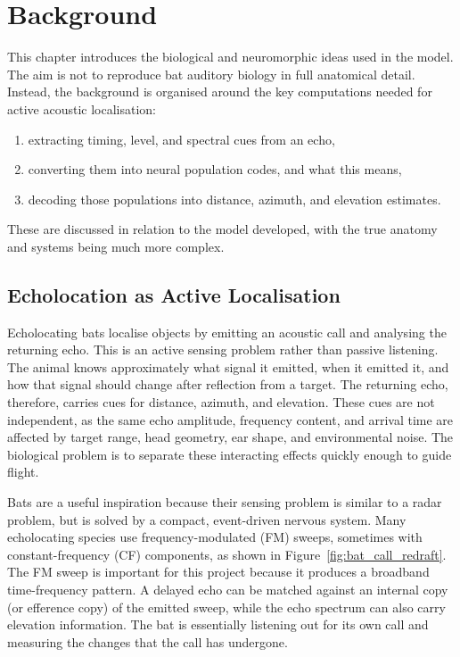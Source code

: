 \chapter{Background} \label{ch:background}

This chapter introduces the biological and neuromorphic ideas used in the model. The aim is not to reproduce bat auditory biology in full anatomical detail. Instead, the background is organised around the key computations needed for active acoustic localisation: 
\begin{enumerate}
    \item extracting timing, level, and spectral cues from an echo,
    \item converting them into neural population codes, and what this means,
    \item decoding those populations into distance, azimuth, and elevation estimates.
\end{enumerate}
These are discussed in relation to the model developed, with the true anatomy and systems being much more complex.


\section{Echolocation as Active Localisation}

Echolocating bats localise objects by emitting an acoustic call and analysing the returning echo. This is an active sensing problem rather than passive listening. The animal knows approximately what signal it emitted, when it emitted it, and how that signal should change after reflection from a target. The returning echo, therefore, carries cues for distance, azimuth, and elevation. These cues are not independent, as the same echo amplitude, frequency content, and arrival time are affected by target range, head geometry, ear shape, and environmental noise. The biological problem is to separate these interacting effects quickly enough to guide flight.

Bats are a useful inspiration because their sensing problem is similar to a radar problem, but is solved by a compact, event-driven nervous system. Many echolocating species use frequency-modulated (FM) sweeps, sometimes with constant-frequency (CF) components, as shown in Figure~\ref{fig:bat_call_redraft}. The FM sweep is important for this project because it produces a broadband time-frequency pattern. A delayed echo can be matched against an internal copy (or efference copy) of the emitted sweep, while the echo spectrum can also carry elevation information. The bat is essentially listening out for its own call and measuring the changes that the call has undergone. 

